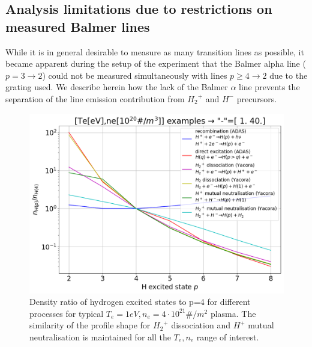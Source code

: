\subsection{Analysis limitations due to restrictions on measured Balmer lines}\label{Limitations due to the measured lines}
While it is in general desirable to measure as many transition lines as possible, it became apparent during the setup of the experiment that the Balmer alpha line ($p=3\rightarrow 2$) could not be measured simultaneously with lines $p\geq 4\rightarrow 2$ due to the grating used. We describe herein how the lack of the Balmer $\alpha$ line prevents the separation of the line emission contribution from ${H_2}^+$ and ${H^-}$ precursors.

\begin{figure}[!ht]
	\centering
	\includegraphics[width=0.7\linewidth,trim={0 0 0 36},clip]{Chapters/chapter3/figs/pure_rates_compare.png}
	\caption{Density ratio of hydrogen excited states to p=4 for different processes for typical $T_e=1eV,n_e=4 \cdot 10^{21}\#/m^2$ plasma. The similarity of the profile shape for ${H_2}^+$ dissociation and $H^+$ mutual neutralisation is maintained for all the $T_e,n_e$ range of interest.}
	\label{fig:lines1}
\end{figure}

